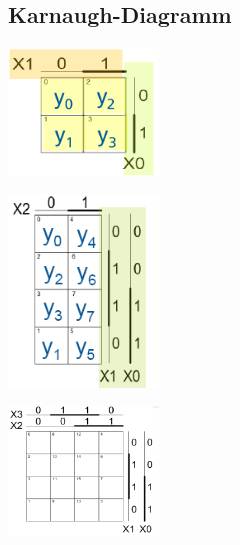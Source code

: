 \subsection{Karnaugh-Diagramm}
	\begin{multicols}{3}
		\includegraphics[width=0.3\textwidth]{pics/kv/2erKV} 
	\columnbreak
	
		\includegraphics[width=0.3\textwidth]{pics/kv/3erKV}
	\columnbreak
	
		\includegraphics[width=0.3\textwidth]{pics/kv/4erKV}
	\end{multicols}
	
